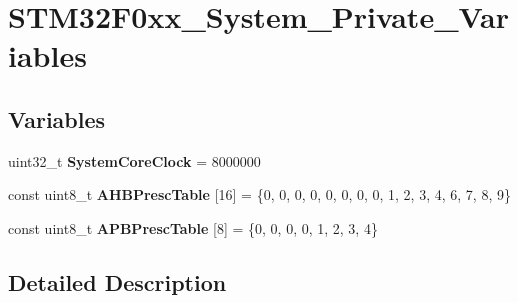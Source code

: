\hypertarget{group___s_t_m32_f0xx___system___private___variables}{}\section{S\+T\+M32\+F0xx\+\_\+\+System\+\_\+\+Private\+\_\+\+Variables}
\label{group___s_t_m32_f0xx___system___private___variables}
\subsection*{Variables}
\begin{DoxyCompactItemize}
\item 
\hypertarget{group___s_t_m32_f0xx___system___private___variables_gaa3cd3e43291e81e795d642b79b6088e6}{}\label{group___s_t_m32_f0xx___system___private___variables_gaa3cd3e43291e81e795d642b79b6088e6} 
uint32\+\_\+t {\bfseries System\+Core\+Clock} = 8000000
\item 
\hypertarget{group___s_t_m32_f0xx___system___private___variables_ga6e1d9cd666f0eacbfde31e9932a93466}{}\label{group___s_t_m32_f0xx___system___private___variables_ga6e1d9cd666f0eacbfde31e9932a93466} 
const uint8\+\_\+t {\bfseries A\+H\+B\+Presc\+Table} \mbox{[}16\mbox{]} = \{0, 0, 0, 0, 0, 0, 0, 0, 1, 2, 3, 4, 6, 7, 8, 9\}
\item 
\hypertarget{group___s_t_m32_f0xx___system___private___variables_ga5b4f8b768465842cf854a8f993b375e9}{}\label{group___s_t_m32_f0xx___system___private___variables_ga5b4f8b768465842cf854a8f993b375e9} 
const uint8\+\_\+t {\bfseries A\+P\+B\+Presc\+Table} \mbox{[}8\mbox{]} = \{0, 0, 0, 0, 1, 2, 3, 4\}
\end{DoxyCompactItemize}


\subsection{Detailed Description}
